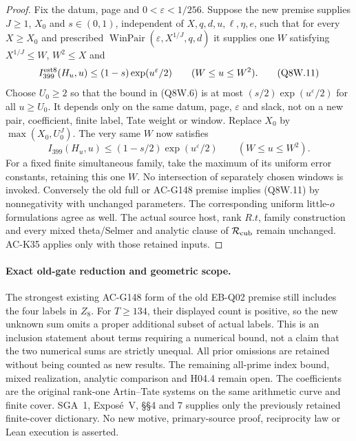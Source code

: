 \begin{proof}
Fix the datum, page and $0<\varepsilon<1/256$.
Suppose the new premise supplies $J\geq1$, $X_0$ and
$s\in(0,1)$, independent of $X,q,d,u,\ell,\eta,e$, such that
for every $X\geq X_0$ and prescribed
$\operatorname{WinPair}(\varepsilon,X^{1/J},q,d)$ it supplies
one $W$ satisfying $X^{1/J}\leq W$, $W^2\leq X$ and
\[
 I_{399}^{\rm est8}(H_u,u)\leq(1-s)\exp(u^\varepsilon/2)
                       \qquad(W\leq u\leq W^2).
 \tag{Q8W.11}
\]
Choose $U_0\geq2$ so that the bound in (Q8W.6) is at most
$(s/2)\exp(u^\varepsilon/2)$ for all $u\geq U_0$.
It depends only on the same datum, page, $\varepsilon$ and slack,
not on a new pair, coefficient, finite label, Tate weight or window.
Replace $X_0$ by $\max(X_0,U_0^J)$.
The very same $W$ now satisfies
\[
 I_{399}(H_u,u)\leq(1-s/2)\exp(u^\varepsilon/2)
                           \qquad(W\leq u\leq W^2).
 \tag{Q8W.12}
\]
For a fixed finite simultaneous family, take the maximum of its
uniform error constants, retaining this one $W$.
No intersection of separately chosen windows is invoked.
Conversely the old full or AC-G148 premise implies (Q8W.11)
by nonnegativity with unchanged parameters.
The corresponding uniform little-$o$ formulations agree as well.
The actual source host, rank $R.t$, family construction and every
mixed theta/Selmer and analytic clause of $\mathcal R_{\rm cub}$
remain unchanged.  AC-K35 applies only with those retained inputs.
\end{proof}

\paragraph{Exact old-gate reduction and geometric scope.}
The strongest existing AC-G148 form of the old EB-Q02 premise
still includes the four labels in $Z_8$.
For $T\geq134$, their displayed count is positive, so the new
unknown sum omits a proper additional subset of actual labels.
This is an inclusion statement about terms requiring a numerical
bound, not a claim that the two numerical sums are strictly unequal.
All prior omissions are retained without being counted as new results.
The remaining all-prime index bound, mixed realization, analytic
comparison and H04.4 remain open.
The coefficients are the original rank-one Artin--Tate systems
on the same arithmetic curve and finite cover.
SGA~1, Expos\'e~V, \S\S4 and 7 supplies only the previously
retained finite-cover dictionary.
No new motive, primary-source proof, reciprocity law or Lean
execution is asserted.
